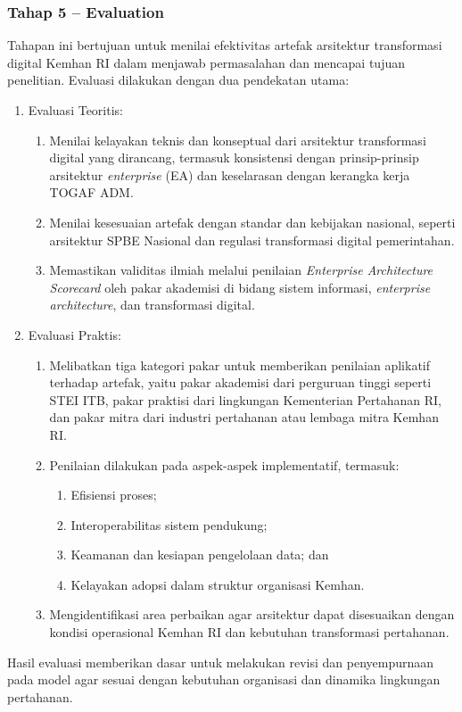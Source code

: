 \subsubsection{Tahap 5 – Evaluation}
Tahapan ini bertujuan untuk menilai efektivitas artefak arsitektur transformasi digital Kemhan RI dalam menjawab permasalahan dan mencapai tujuan penelitian. Evaluasi dilakukan dengan dua pendekatan utama:
\begin{enumerate}
  \item Evaluasi Teoritis:
  \begin{enumerate}
    \item Menilai kelayakan teknis dan konseptual dari arsitektur transformasi digital yang dirancang, termasuk konsistensi dengan prinsip-prinsip arsitektur \textit{enterprise} (EA) dan keselarasan dengan kerangka kerja TOGAF ADM.
    \item Menilai kesesuaian artefak dengan standar dan kebijakan nasional, seperti arsitektur SPBE Nasional dan regulasi transformasi digital pemerintahan.
    \item Memastikan validitas ilmiah melalui penilaian \textit{Enterprise Architecture Scorecard} oleh pakar akademisi di bidang sistem informasi, \textit{enterprise architecture}, dan transformasi digital.
  \end{enumerate}
  \item Evaluasi Praktis:
  \begin{enumerate}
    \item Melibatkan tiga kategori pakar untuk memberikan penilaian aplikatif terhadap artefak, yaitu pakar akademisi dari perguruan tinggi seperti STEI ITB, pakar praktisi dari lingkungan Kementerian Pertahanan RI, dan pakar mitra dari industri pertahanan atau lembaga mitra Kemhan RI.
    \item Penilaian dilakukan pada aspek-aspek implementatif, termasuk:
    \begin{enumerate}
      \item Efisiensi proses;
      \item Interoperabilitas sistem pendukung;
      \item Keamanan dan kesiapan pengelolaan data; dan
      \item Kelayakan adopsi dalam struktur organisasi Kemhan.
    \end{enumerate}
    \item Mengidentifikasi area perbaikan agar arsitektur dapat disesuaikan dengan kondisi operasional Kemhan RI dan kebutuhan transformasi pertahanan.
  \end{enumerate}
\end{enumerate}
Hasil evaluasi memberikan dasar untuk melakukan revisi dan penyempurnaan pada model agar sesuai dengan kebutuhan organisasi dan dinamika lingkungan pertahanan.

